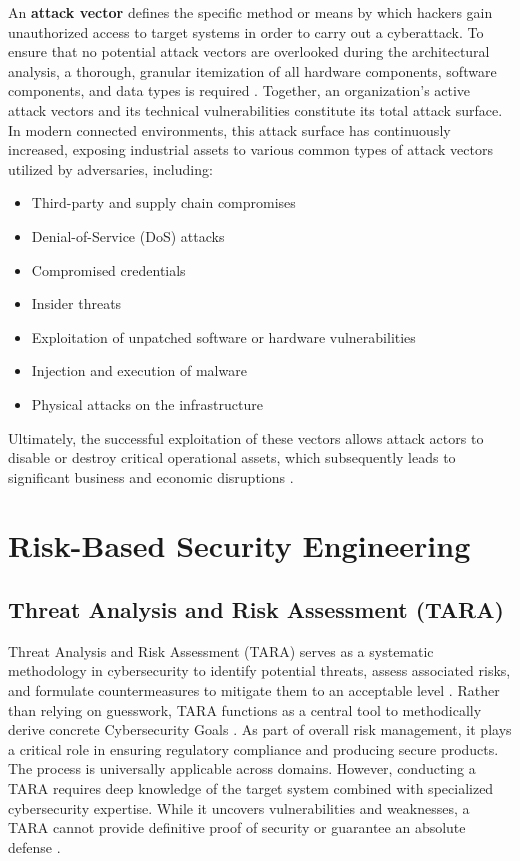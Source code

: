 An \textbf{attack vector} defines the specific method or means by which hackers gain unauthorized access to target systems in order to carry out a cyberattack. To ensure that no potential attack vectors are overlooked during the architectural analysis, a thorough, granular itemization of all hardware components, software components, and data types is required \cite[p. 2]{liebl2024analyzingattacksurfacethreats} \cite[p. 11]{liebl2024analyzingattacksurfacethreats}. Together, an organization's active attack vectors and its technical vulnerabilities constitute its total attack surface. In modern connected environments, this attack surface has continuously increased, exposing industrial assets to various common types of attack vectors utilized by adversaries, including:
\begin{itemize}
	\item Third-party and supply chain compromises
	\item Denial-of-Service (DoS) attacks
	\item Compromised credentials
	\item Insider threats
	\item Exploitation of unpatched software or hardware vulnerabilities
	\item Injection and execution of malware
	\item Physical attacks on the infrastructure 
\end{itemize}
Ultimately, the successful exploitation of these vectors allows attack actors to disable or destroy critical operational assets, which subsequently leads to significant business and economic disruptions \cite{IBM_AttackVector}.


\section{Risk-Based Security Engineering} 
\label{sec:risk_based_security_engineering} 


\subsection{Threat Analysis and Risk Assessment (TARA)} 
\label{subsec:tara} 

Threat Analysis and Risk Assessment (TARA) serves as a systematic methodology in cybersecurity to identify potential threats, assess associated risks, and formulate countermeasures to mitigate them to an acceptable level \cite[p. 37]{doCarmo2025}. Rather than relying on guesswork, TARA functions as a central tool to methodically derive concrete Cybersecurity Goals \cite{microtool_tara_2026}. As part of overall risk management, it plays a critical role in ensuring regulatory compliance and producing secure products. The process is universally applicable across domains. However, conducting a TARA requires deep knowledge of the target system combined with specialized cybersecurity expertise. While it uncovers vulnerabilities and weaknesses, a TARA cannot provide definitive proof of security or guarantee an absolute defense \cite[p. 38]{doCarmo2025}.

